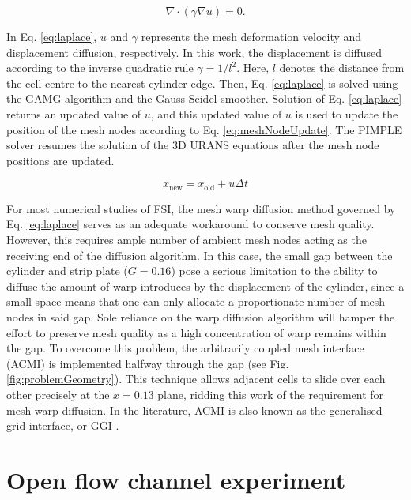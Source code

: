 \documentclass[oneside]{utmthesis}
\begin{document}
\begin{equation}
  \nabla \cdot \left( \gamma \nabla u \right) = 0.
  \label{eq:laplace}
\end{equation}

In Eq. \ref{eq:laplace}, $u$ and $\gamma$ represents the mesh deformation velocity and displacement diffusion, respectively. In this work, the displacement is diffused according to the inverse quadratic rule $\gamma = 1/l^{2}$. Here, $l$ denotes the distance from the cell centre to the nearest cylinder edge. Then, Eq. \ref{eq:laplace} is solved using the GAMG algorithm and the Gauss-Seidel smoother. Solution of Eq. \ref{eq:laplace} returns an updated value of $u$, and this updated value of $u$ is used to update the position of the mesh nodes according to Eq. \ref{eq:meshNodeUpdate}. The PIMPLE solver resumes the solution of the 3D URANS equations after the mesh node positions are updated.

\begin{equation}
  x_{\text{new}} = x_{\text{old}} + u \Delta t
  \label{eq:meshNodeUpdate}
\end{equation}

For most numerical studies of FSI, the mesh warp diffusion method governed by Eq. \ref{eq:laplace} serves as an adequate workaround to conserve mesh quality. However, this requires ample number of ambient mesh nodes acting as the receiving end of the diffusion algorithm. In this case, the small gap between the cylinder and strip plate ($G = 0.16$) pose a serious limitation to the ability to diffuse the amount of warp introduces by the displacement of the cylinder, since a small space means that one can only allocate a proportionate number of mesh nodes in said gap. Sole reliance on the warp diffusion algorithm will hamper the effort to preserve mesh quality as a high concentration of warp remains within the gap. To overcome this problem, the arbitrarily coupled mesh interface (ACMI) is implemented halfway through the gap (see Fig. \ref{fig:problemGeometry}). This technique allows adjacent cells to slide over each other precisely at the $x = 0.13$ plane, ridding this work of the requirement for mesh warp diffusion. In the literature, ACMI is also known as the generalised grid interface, or GGI \citep{Zhang2018,Sun2019b}.

\section{Open flow channel experiment} \label{sec:openFlowExp}
\end{document}
